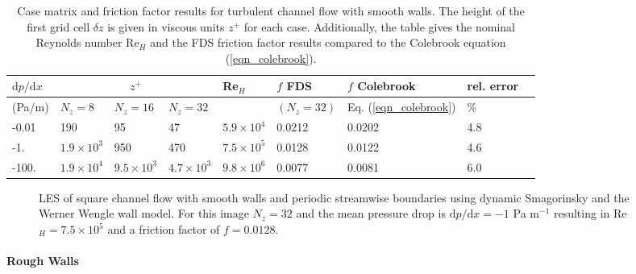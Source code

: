 \documentclass[11pt]{book}
\begin{document}
\begin{table}
\begin{center}
\caption{\label{tab_zplus} \small Case matrix and friction factor results for turbulent channel flow with smooth walls.  The height of the first grid cell $\delta z$ is given in viscous units $z^+$ for each case.  Additionally, the table gives the nominal Reynolds number Re$_H$ and the FDS friction factor results compared to the Colebrook equation (\ref{eqn_colebrook}).}
\vspace{0.5cm}
\begin{tabular}{|*{9}{l|}}
\hline
$\mbox{d}p/\mbox{d}x$   & \multicolumn{3}{c|}{$z^+$} &  Re$_H$  & $f$ FDS  & $f$ Colebrook & rel. error \\
\hline (Pa/m)          & $N_z=8$          & $N_z=16$          & $N_z=32$          &                   & $(N_z=32)$ & Eq. (\ref{eqn_colebrook}) & \% \\
\hline\hline -0.01  & 190              & 95                & 47                & $5.9\times 10^4$  & 0.0212     & 0.0202   & 4.8                 \\
\hline -1.    & $1.9\times 10^3$ & 950               & 470               & $7.5\times 10^5$  & 0.0128     & 0.0122   & 4.6                 \\
\hline -100.  & $1.9\times 10^4$ & $9.5\times 10^3$  & $4.7\times 10^3$  & $9.8\times 10^6$  & 0.0077     & 0.0081   & 6.0                 \\
\hline
\end{tabular}
\end{center}
\end{table}
\begin{figure}
   \begin{center}
      \caption{\label{fig_channel_flow_setup} \small LES of square channel flow with smooth walls and periodic streamwise boundaries using dynamic Smagorinsky and the Werner Wengle wall model.  For this image $N_z=32$ and the mean pressure drop is $\mbox{d}p/\mbox{d}x = -1$ Pa m$^{-1}$ resulting in Re$_H = 7.5\times 10^5$ and a friction factor of $f=0.0128$.}
   \end{center}
\end{figure}

\paragraph{Rough Walls}
\end{document}
